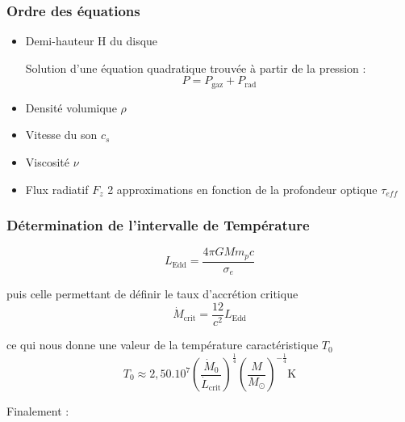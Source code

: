 \documentclass[french]{beamer}
\begin{document}

\begin{frame}
\frametitle{Ordre des équations}

   \begin{itemize}
      \item Demi-hauteur H du disque

      Solution d'une équation quadratique trouvée à partir de la pression :
      \begin{equation}
         P = P_\mathrm{gaz} + P_\mathrm{rad}
      \end{equation}
      
      \item Densité volumique $\rho$
      \item Vitesse du son $c_s$ 
      \item Viscosité $\nu$ 
      \item Flux radiatif $F_z$
      2 approximations en fonction de la profondeur optique $\tau_{eff}$
   \end{itemize}
\end{frame}



\begin{frame}
\frametitle{Détermination de l'intervalle de Température} 

   \begin{equation}
      L_\mathrm{Edd} = \frac{4\pi GMm_pc}{\sigma_e}
   \end{equation}

   puis celle permettant de définir le taux d’accrétion critique 
   \begin{equation}
      \dot{M}_\mathrm{crit} = \frac{12}{c^2}L_\mathrm{Edd} 
   \end{equation}

   ce qui nous donne une valeur de la température caractéristique $T_0$
   \begin{equation}
      T_0 \approx 2,50.10^7\left(\frac{\dot{M}_0}{\dot{L}_\mathrm{crit}}\right)^{\frac{1}{4}}\left(\frac{M}{M_\odot}\right)^{-\frac{1}{4}} \mathrm{K}
   \end{equation}

   Finalement : %

\end{frame}
\end{document}
